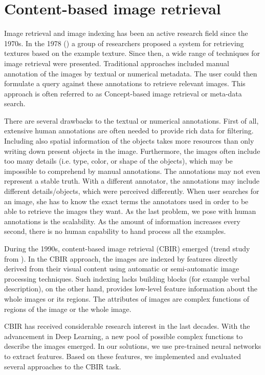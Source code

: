 \chapter{Content-based image retrieval}

Image retrieval and image indexing has been an active research field since the 1970s. In the 1978 (\cite{tamura1978textural}) a group of researchers proposed a system for retrieving textures based on the example texture. Since then, a wide range of techniques for image retrieval were presented. Traditional approaches included manual annotation of the images by textual or numerical metadata. The user could then formulate a query against these annotations to retrieve relevant images. This approach is often referred to as Concept-based image retrieval or meta-data search.

There are several drawbacks to the textual or numerical annotations. First of all, extensive human annotations are often needed to provide rich data for filtering. Including also spatial information of the objects takes more resources than only writing down present objects in the image. Furthermore, the images often include too many details (i.e. type, color, or shape of the objects), which may be impossible to comprehend by manual annotations.  The annotations may not even represent a stable truth. With a different annotator, the annotations may include different details/objects, which were perceived differently. When user searches for an image, she has to know the exact terms the annotators used in order to be able to retrieve the images they want. As the last problem, we pose with human annotations is the scalability. As the amount of information increases every second, there is no human capability to hand process all the examples.

During the 1990s, content-based image retrieval (CBIR) emerged (trend study from \cite{datta2008image}). In the CBIR approach, the images are indexed by features directly derived from their visual content using automatic or semi-automatic image processing techniques. Such indexing lacks building blocks (for example verbal description), on the other hand, provides low-level feature information about the whole images or its regions. The attributes of images are complex functions of regions of the image or the whole image.

CBIR has received considerable research interest in the last decades. With the advancement in Deep Learning, a new pool of possible complex functions to describe the images emerged. In our solutions, we use pre-trained neural networks to extract features. Based on these features, we implemented and evaluated several approaches to the CBIR task.

